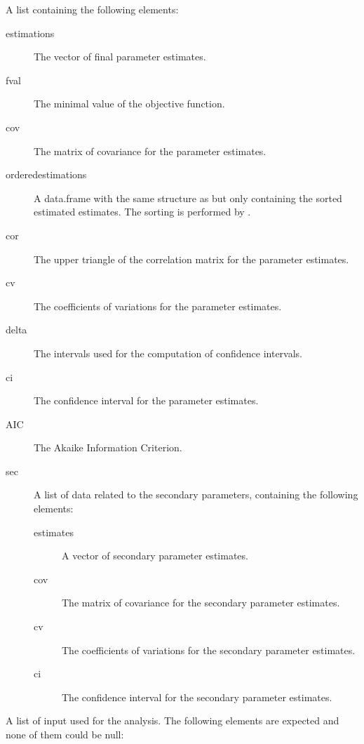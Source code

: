 \begin{Arguments}
\begin{ldescription}
\begin{description}
\end{description}


\item[\code{Fit}] A list containing the following elements:\begin{description}

\item[estimations] The vector of final parameter estimates.
\item[fval] The minimal value of the objective function.
\item[cov] The matrix of covariance for the parameter estimates.
\item[orderedestimations] A data.frame with the same structure as
 but only containing the sorted estimated estimates.
The sorting is performed by .
\item[cor] The upper triangle of the correlation matrix for the parameter
estimates.
\item[cv] The coefficients of variations for the parameter estimates.
\item[delta] The intervals used for the computation of confidence
intervals.
\item[ci] The confidence interval for the parameter estimates.
\item[AIC] The Akaike Information Criterion.
\item[sec] A list of data related to the secondary parameters, containing
the following elements:\begin{description}

\item[estimates] A vector of secondary parameter estimates.
\item[cov] The matrix of covariance for the secondary parameter
estimates.
\item[cv] The coefficients of variations for the secondary parameter
estimates.
\item[ci] The confidence interval for the secondary parameter
estimates.

\end{description}



\end{description}


\item[\code{files}] A list of input used for the analysis. The following elements are
expected and none of them could be null: \begin{description}


\end{description}
\end{ldescription}
\end{Arguments}
